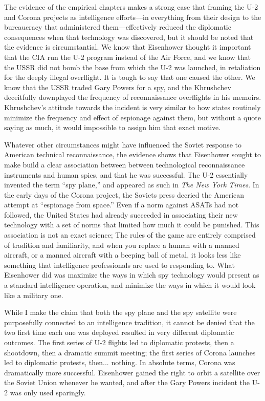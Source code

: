 \documentclass{report}
\begin{document}
The evidence of the empirical chapters makes a strong case that framing the U-2 and Corona projects as intelligence efforts---in everything from their design to the bureaucracy that administered them---effectively reduced the diplomatic consequences when that technology was discovered, but it should be noted that the evidence is circumstantial. We know that Eisenhower thought it important that the CIA run the U-2 program instead of the Air Force, and we know that the USSR did not bomb the base from which the U-2 was launched, in retaliation for the deeply illegal overflight. It is tough to say that one caused the other. We know that the USSR traded Gary Powers for a spy, and the Khrushchev deceitfully downplayed the frequency of reconnaissance overflights in his memoirs. Khrushchev's attitude towards the incident is very similar to how states routinely minimize the frequency and effect of espionage against them, but without a quote saying as much, it would impossible to assign him that exact motive.

Whatever other circumstances might have influenced the Soviet response to American technical reconnaissance, the evidence shows that Eisenhower sought to make build a clear association between between technological reconnaissance instruments and human spies, and that he was successful. The U-2 essentially invented the term ``spy plane,'' and appeared as such in \emph{The New York Times}. In the early days of the Corona project, the Soviets press decried the American attempt at ``espionage from space.'' Even if a norm against ASATs had not followed, the United States had already succeeded in associating their new technology with a set of norms that limited how much it could be punished. This association is not an exact science; The rules of the game are entirely comprised of tradition and familiarity, and when you replace a human with a manned aircraft, or a manned aircraft with a beeping ball of metal, it looks less like something that intelligence professionals are used to responding to. What Eisenhower did was maximize the ways in which spy technology would present as a standard intelligence operation, and minimize the ways in which it would look like a military one.

While I make the claim that both the spy plane and the spy satellite were purposefully connected to an intelligence tradition, it cannot be denied that the two first time each one was deployed resulted in very different diplomatic outcomes. The first series of U-2 flights led to diplomatic protests, then a shootdown, then a dramatic summit meeting; the first series of Corona launches led to diplomatic protests, then... nothing. In absolute terms, Corona was dramatically more successful. Eisenhower gained the right to orbit a satellite over the Soviet Union whenever he wanted, and after the Gary Powers incident the U-2 was only used sparingly.
\end{document}
